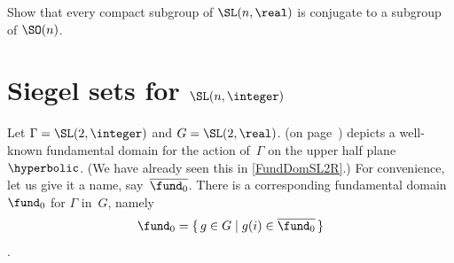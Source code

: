 \begin{exercises}
\item \label{ConjToSOn}
Show that every compact subgroup of $\SL(n,\real)$ is conjugate to a subgroup of $\SO(n)$.

\end{exercises}





\section{Siegel sets for \texorpdfstring{$\SL(\lowercase{n},\integer)$}{SL(n,Z)}}  \label{SiegelSLnZSect}

\begin{eg}
Let $\Gamma = \SL(2,\integer)$ and $G = \SL(2,\real)$.
  (on page~\pageref{FunDomSL2ZFig}) 
depicts a well-known fundamental domain for the action of~$\Gamma$ on the upper half plane~$\hyperbolic$. (We have already seen this in \cref{FundDomSL2R}.)
For convenience, let us give it a name, say~$\overline{\fund_0}$. There is a corresponding fundamental domain~$\fund_0$ for $\Gamma$ in~$G$, namely
	$$ \fund_0 = \{\, g \in G \mid g(i) \in \overline{\fund_0} \,\} $$
.
\end{eg}

